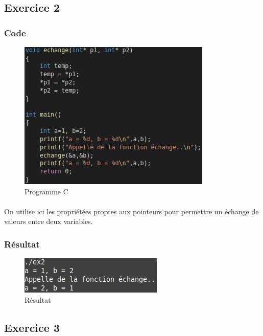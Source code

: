 \documentclass[10pt,a4paper]{article}
\begin{document}
\pagebreak
\subsection{Exercice 2}
\subsubsection{Code}
\begin{figure}[h]
	\begin{center}
	\includegraphics[scale=.3]{images/swap_p_c}
	\end{center}
	\caption{Programme C}
	\end{figure}
	\paragraph{}
	On utilise ici les propriétées propres aux pointeurs pour permettre un échange de valeurs entre deux variables.
	\subsubsection{Résultat}
	\begin{figure}[h] 
	\begin{center}
	\includegraphics[scale=.3]{images/swap_p_ex}
	\end{center}
	\caption{Résultat}
	\end{figure}

\pagebreak
\subsection{Exercice 3}
\end{document}
